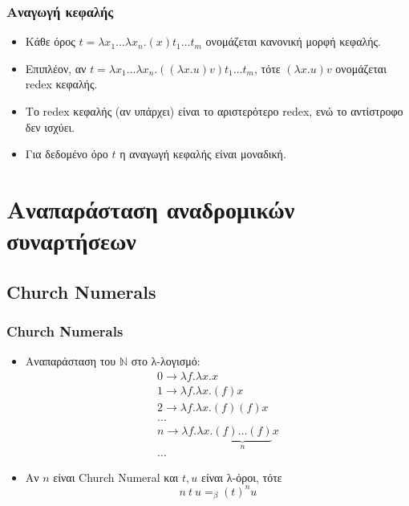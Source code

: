 \documentclass{beamer}
\begin{document}
\begin{frame}
\frametitle{Αναγωγή κεφαλής}
\begin{itemize}
\item Κάθε όρος $t = \lambda x_1 \ldots \lambda x_n . (x) t_1 \ldots t_m$ ονομάζεται κανονική μορφή κεφαλής.\pause
\item Επιπλέον, αν $t = \lambda x_1 \ldots \lambda x_n . ((\lambda x . u) v) t_1 \ldots t_m$, τότε $(\lambda x . u) v$ ονομάζεται redex κεφαλής.\pause
\item Το redex κεφαλής (αν υπάρχει) είναι το αριστερότερο redex, ενώ το αντίστροφο δεν ισχύει.\pause
\item Για δεδομένο όρο $t$ η αναγωγή κεφαλής είναι μοναδική.
\end{itemize}
\end{frame}


\section{Αναπαράσταση αναδρομικών συναρτήσεων}

\subsection{Church Numerals}

\begin{frame}
        \frametitle{Church Numerals}
        \begin{itemize}
                \item Αναπαράσταση του \( \mathbb{N} \) στο λ-λογισμό:
                \pause
	        	\[ \begin{array}{l}
	        		0 \rightarrow \lambda f . \lambda x . x \\
	        		1 \rightarrow \lambda f . \lambda x . (f) x \\
	        		2 \rightarrow \lambda f . \lambda x . (f) (f) x \\
	        		\ldots \\
	        		n \rightarrow \lambda f . \lambda x . \underbrace{(f) \ldots (f)}_n x \\
	        		\ldots
	        	\end{array} \]
	        	\pause
                \item Αν \(n \) είναι Church Numeral και \(t, u\) είναι λ-όροι, τότε
                \[ n\:t\:u =_\beta (t)^n u \]
        \end{itemize}
\end{frame}
\end{document}
